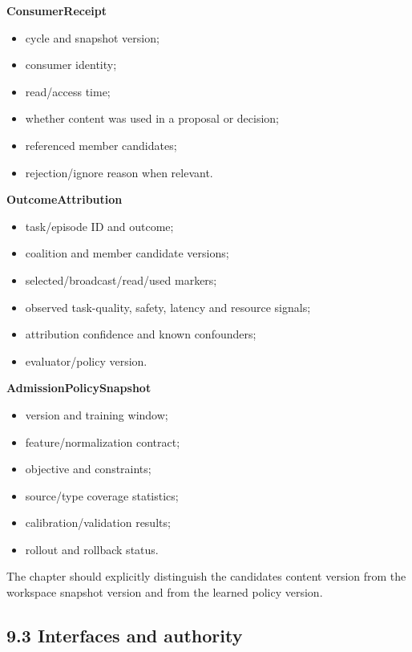 \textbf{ConsumerReceipt}

\begin{itemize}
\tightlist
\item
  cycle and snapshot version;
\item
  consumer identity;
\item
  read/access time;
\item
  whether content was used in a proposal or decision;
\item
  referenced member candidates;
\item
  rejection/ignore reason when relevant.
\end{itemize}

\textbf{OutcomeAttribution}

\begin{itemize}
\tightlist
\item
  task/episode ID and outcome;
\item
  coalition and member candidate versions;
\item
  selected/broadcast/read/used markers;
\item
  observed task-quality, safety, latency and resource signals;
\item
  attribution confidence and known confounders;
\item
  evaluator/policy version.
\end{itemize}

\textbf{AdmissionPolicySnapshot}

\begin{itemize}
\tightlist
\item
  version and training window;
\item
  feature/normalization contract;
\item
  objective and constraints;
\item
  source/type coverage statistics;
\item
  calibration/validation results;
\item
  rollout and rollback status.
\end{itemize}

The chapter should explicitly distinguish the candidate\textquotesingle s content version from the workspace snapshot version and from the learned policy version.

\subsection{9.3 Interfaces and authority}\label{93-interfaces-and-authority}

